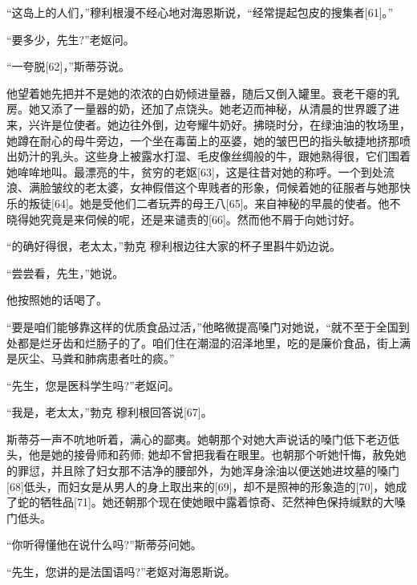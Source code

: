 \documentclass{article}
\begin{document}
“这岛上的人们，”穆利根漫不经心地对海恩斯说，“经常提起包皮的搜集者[61]。”



“要多少，先生?”老妪问。



“一夸脱[62]，”斯蒂芬说。



他望着她先把并不是她的浓浓的白奶倾进量器，随后又倒入罐里。衰老干瘪的乳房。她又添了一量器的奶，还加了点饶头。她老迈而神秘，从清晨的世界踱了进来，兴许是位使者。她边往外倒，边夸耀牛奶好。拂晓时分，在绿油油的牧场里，她蹲在耐心的母牛旁边，一个坐在毒菌上的巫婆，她的皱巴巴的指头敏捷地挤那喷出奶汁的乳头。这些身上被露水打湿、毛皮像丝绸般的牛，跟她熟得很，它们围着她哞哞地叫。最漂亮的牛，贫穷的老妪[63]，这是往昔对她的称呼。一个到处流浪、满脸皱纹的老太婆，女神假借这个卑贱者的形象，伺候着她的征服者与她那快乐的叛徒[64]。她是受他们二者玩弄的母王八[65]。来自神秘的早晨的使者。他不晓得她究竟是来伺候的呢，还是来谴责的[66]。然而他不屑于向她讨好。



“的确好得很，老太太，”勃克 \cdot 穆利根边往大家的杯子里斟牛奶边说。



“尝尝看，先生，”她说。



他按照她的话喝了。



“要是咱们能够靠这样的优质食品过活，”他略微提高嗓门对她说，“就不至于全国到处都是烂牙齿和烂肠子的了。咱们住在潮湿的沼泽地里，吃的是廉价食品，街上满是灰尘、马粪和肺病患者吐的痰。”



“先生，您是医科学生吗?”老妪问。



“我是，老太太，”勃克 \cdot 穆利根回答说[67]。



斯蒂芬一声不吭地听着，满心的鄙夷。她朝那个对她大声说话的嗓门低下老迈低头，他是她的接骨师和药师; 她却不曾把我看在眼里。也朝那个听她忏悔，赦免她的罪愆，并且除了妇女那不洁净的腰部外，为她浑身涂油以便送她进坟墓的嗓门[68]低头，而妇女是从男人的身上取出来的[69]，却不是照神的形象造的[70]，她成了蛇的牺牲品[71]。她还朝那个现在使她眼中露着惊奇、茫然神色保持缄默的大嗓门低头。



“你听得懂他在说什么吗?”斯蒂芬问她。



“先生，您讲的是法国语吗?”老妪对海恩斯说。
\end{document}

